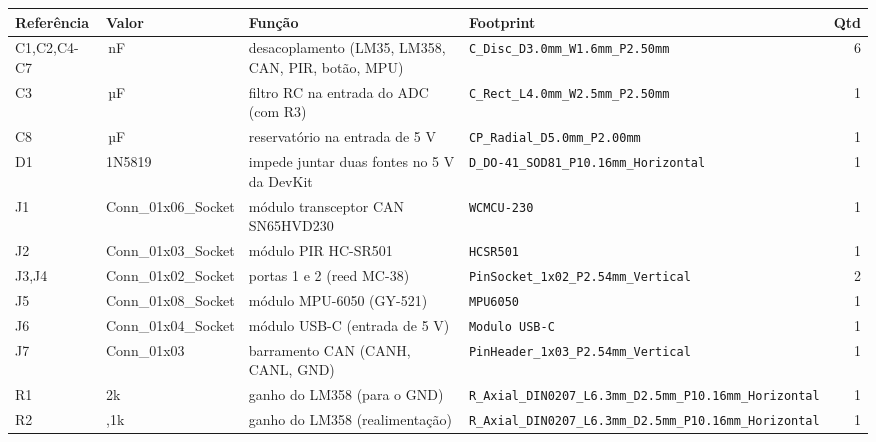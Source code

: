 \begin{tabular}{@{}l >{\raggedright\arraybackslash}p{2.3cm} >{\raggedright\arraybackslash}p{4.4cm} >{\raggedright\arraybackslash}p{4.4cm} r@{}}
\toprule
Referência & Valor & Função & Footprint & Qtd \\
\midrule
C1,C2,C4-C7 & 100\,nF & desacoplamento (LM35, LM358, CAN, PIR, botão, MPU) & \texttt{\scriptsize C\_\allowbreak{}Disc\_\allowbreak{}D3.0mm\_\allowbreak{}W1.6mm\_\allowbreak{}P2.50mm} & 6 \\
C3 & 1\,µF & filtro RC na entrada do ADC (com R3) & \texttt{\scriptsize C\_\allowbreak{}Rect\_\allowbreak{}L4.0mm\_\allowbreak{}W2.5mm\_\allowbreak{}P2.50mm} & 1 \\
C8 & 10\,µF & reservatório na entrada de 5 V & \texttt{\scriptsize CP\_\allowbreak{}Radial\_\allowbreak{}D5.0mm\_\allowbreak{}P2.00mm} & 1 \\
D1 & 1N5819 & impede juntar duas fontes no 5 V da DevKit & \texttt{\scriptsize D\_\allowbreak{}DO-41\_\allowbreak{}SOD81\_\allowbreak{}P10.16mm\_\allowbreak{}Horizontal} & 1 \\
J1 & Conn\_\allowbreak{}01x06\_\allowbreak{}Socket & módulo transceptor CAN SN65HVD230 & \texttt{\scriptsize WCMCU-230} & 1 \\
J2 & Conn\_\allowbreak{}01x03\_\allowbreak{}Socket & módulo PIR HC-SR501 & \texttt{\scriptsize HCSR501} & 1 \\
J3,J4 & Conn\_\allowbreak{}01x02\_\allowbreak{}Socket & portas 1 e 2 (reed MC-38) & \texttt{\scriptsize PinSocket\_\allowbreak{}1x02\_\allowbreak{}P2.54mm\_\allowbreak{}Vertical} & 2 \\
J5 & Conn\_\allowbreak{}01x08\_\allowbreak{}Socket & módulo MPU-6050 (GY-521) & \texttt{\scriptsize MPU6050} & 1 \\
J6 & Conn\_\allowbreak{}01x04\_\allowbreak{}Socket & módulo USB-C (entrada de 5 V) & \texttt{\scriptsize Modulo USB-C} & 1 \\
J7 & Conn\_\allowbreak{}01x03 & barramento CAN (CANH, CANL, GND) & \texttt{\scriptsize PinHeader\_\allowbreak{}1x03\_\allowbreak{}P2.54mm\_\allowbreak{}Vertical} & 1 \\
R1 & 2k & ganho do LM358 (para o GND) & \texttt{\scriptsize R\_\allowbreak{}Axial\_\allowbreak{}DIN0207\_\allowbreak{}L6.3mm\_\allowbreak{}D2.5mm\_\allowbreak{}P10.16mm\_\allowbreak{}Horizontal} & 1 \\
R2 & 9,1k & ganho do LM358 (realimentação) & \texttt{\scriptsize R\_\allowbreak{}Axial\_\allowbreak{}DIN0207\_\allowbreak{}L6.3mm\_\allowbreak{}D2.5mm\_\allowbreak{}P10.16mm\_\allowbreak{}Horizontal} & 1 \\

\end{tabular}
